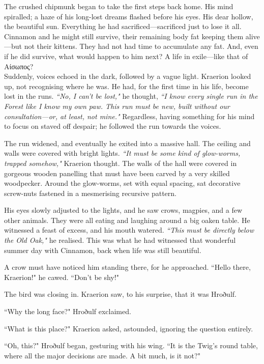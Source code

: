 The crushed chipmunk began to take the first steps back home.
His mind spiralled; a haze of his long-lost dreams flashed before his eyes.
His dear hollow, the beautiful sun.
Everything he had sacrificed---sacrificed just to lose it all.
Cinnamon and he might still survive, their remaining body fat keeping them alive---but not their kittens.
They had not had time to accumulate any fat.
And, even if he did survive, what would happen to him next?
A life in exile---like that of Αίσωπος?\\

Suddenly, voices echoed in the dark, followed by a vague light.
Kraerion looked up, not recognising where he was.
He had, for the first time in his life, become lost in the runs.
\textit{``No, I can't be lost,"} he thought, \textit{``I know every single run in the Forest like I know my own paw. This run must be new, built without our consultation---or, at least, not mine."}
Regardless, having something for his mind to focus on staved off despair; he followed the run towards the voices.

The run widened, and eventually he exited into a massive hall.
The ceiling and walls were covered with bright lights. \textit{``It must be some kind of glow-worms, trapped somehow,"} Kraerion thought.
The walls of the hall were covered in gorgeous wooden panelling that must have been carved by a very skilled woodpecker.
Around the glow-worms, set with equal spacing, sat decorative screw-nuts fastened in a mesmerising recursive pattern.

His eyes slowly adjusted to the lights, and he saw crows, magpies, and a few other animals.
They were all eating and laughing around a big oaken table.
He witnessed a feast of excess, and his mouth watered.
\textit{``This must be directly below the Old Oak,"} he realised.
This was what he had witnessed that wonderful summer day with Cinnamon, back when life was still beautiful.

A crow must have noticed him standing there, for he approached.
``Hello there, Kraerion!" he cawed.
``Don't be shy!"

The bird was closing in.
Kraerion saw, to his surprise, that it was Hroðulf.

``Why the long face?" Hroðulf exclaimed.

``What is this place?" Kraerion asked, astounded, ignoring the question entirely.

``Oh, this?" Hroðulf began, gesturing with his wing.
``It is the Twig's round table, where all the major decisions are made.
A bit much, is it not?"

